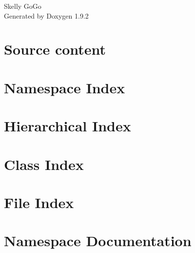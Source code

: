 \documentclass[twoside]{book}
\newcommand{\+}{\discretionary{\mbox{\scriptsize$\hookleftarrow$}}{}{}}
\newcommand{\clearemptydoublepage}{%
    \newpage{\pagestyle{empty}\cleardoublepage}%
  }
\begin{document}
  \raggedbottom
    \hypersetup{pageanchor=false,
                bookmarksnumbered=true,
                pdfencoding=unicode
               }
  \begin{titlepage}
  \vspace*{7cm}
  \begin{center}%
  {\Large Skelly Go\+Go}\\
  \vspace*{1cm}
  {\large Generated by Doxygen 1.9.2}\\
  \end{center}
  \end{titlepage}
  \clearemptydoublepage
  \tableofcontents
  \clearemptydoublepage
  \hypersetup{pageanchor=true}
\chapter{Source content}
\label{md_src_readme}

\chapter{Namespace Index}

\chapter{Hierarchical Index}

\chapter{Class Index}

\chapter{File Index}

\chapter{Namespace Documentation}





\end{document}
